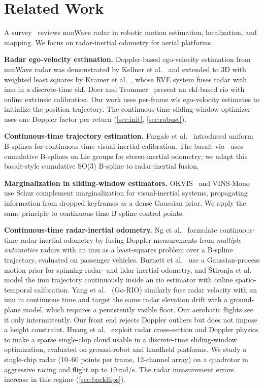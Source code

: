 \section{Related Work}
\label{sec:related}

A survey~\cite{harlow2024survey} reviews mmWave radar in robotic
motion estimation, localization, and mapping.  We focus on
radar-inertial odometry for aerial platforms.

\textbf{Radar ego-velocity estimation.}
Doppler-based ego-velocity estimation from mmWave radar was
demonstrated by Kellner et al.~\cite{kellner2013instantaneous} and
extended to 3D with weighted least squares by
Kramer et al.~\cite{kramer2020rve}, whose RVE system fuses radar
with \ac{imu} in a discrete-time \ac{ekf}.  Doer and
Trommer~\cite{doer2020ekf} present an \ac{ekf}-based \ac{rio} with online
extrinsic calibration.  Our work uses per-frame \ac{wls}
ego-velocity estimates to initialize the position trajectory.
The continuous-time sliding-window optimizer uses one Doppler factor
per return (\autoref{sec:init}, \autoref{sec:robust}).

\textbf{Continuous-time trajectory estimation.}
Furgale et al.~\cite{furgale2013unified} introduced uniform B-splines
for continuous-time visual-inertial calibration.  The basalt
\ac{vio}~\cite{usenko2020basalt} uses cumulative B-splines on Lie groups
for stereo-inertial odometry; we adapt this basalt-style
cumulative SO(3) B-spline to radar-inertial fusion.

\textbf{Marginalization in sliding-window estimators.}
OKVIS~\cite{leutenegger2015keyframe} and
VINS-Mono~\cite{qin2018vins} use Schur complement
marginalization for visual-inertial systems, propagating information
from dropped keyframes as a dense Gaussian prior. We apply the same
principle to continuous-time B-spline control points.

\textbf{Continuous-time radar-inertial odometry.}
Ng et al.~\cite{ng2021ctrio} formulate continuous-time radar-inertial
odometry by fusing Doppler measurements from
\emph{multiple automotive} radars with an \ac{imu} as a least-squares
problem over a B-spline trajectory, evaluated on passenger vehicles.
Burnett et al.~\cite{burnett2025gp} use a Gaussian-process motion
prior for spinning-radar- and lidar-inertial odometry, and
\v{S}tironja et al.~\cite{stironja2026rio} model the \ac{imu} trajectory
continuously inside an \ac{rio} estimator with online spatio-temporal
calibration.  Yang et al.~\cite{yang2025gorio} (Go-RIO)
similarly fuse radar velocity with an \ac{imu} in continuous time and
target the same radar elevation drift with a ground-plane model, which
requires a persistently visible floor.  Our aerobatic flights see it
only intermittently.  Our front end rejects Doppler outliers but does
not impose a height constraint.  Huang et al.~\cite{huang2024lessismore}
exploit radar cross-section and Doppler physics to make a sparse
single-chip cloud usable in a discrete-time sliding-window
optimization, evaluated on ground-robot and handheld platforms.
We study a single-chip radar (10--60 points per frame,
12-channel array) on a quadrotor in aggressive racing and
 flight up to $10$\,rad/s.
The radar measurement errors increase in this regime
(\autoref{sec:backflips}).

